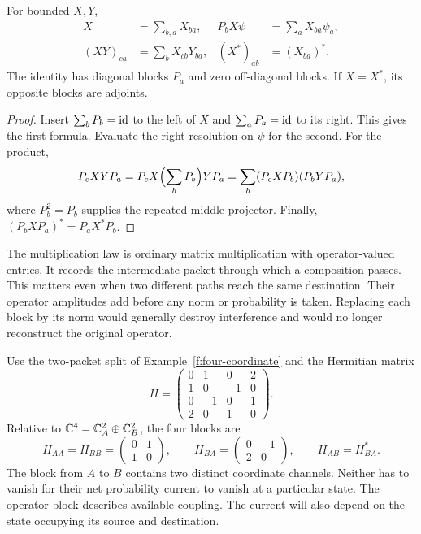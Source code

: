 \begin{proposition}\label{f:block-calculus}
For bounded $X,Y$,
\begin{align}
 X&=\sum_{b,a}X_{ba}, & P_bX\psi&=\sum_aX_{ba}\psi_a,\label{f:block-reconstruction}\\
 (XY)_{ca}&=\sum_bX_{cb}Y_{ba}, & (X^*)_{ab}&=(X_{ba})^*.
 \label{f:block-product}
\end{align}
The identity has diagonal blocks $P_a$ and zero off-diagonal blocks. If $X=X^*$, its opposite blocks are adjoints.
\end{proposition}

\begin{proof}
Insert $\sum_bP_b=\mathrm{id}$ to the left of $X$ and $\sum_aP_a=\mathrm{id}$ to its right. This gives the first formula. Evaluate the right resolution on $\psi$ for the second. For the product,
\[
 P_cXYP_a=P_cX\Bigl(\sum_bP_b\Bigr)YP_a
 =\sum_b(P_cXP_b)(P_bYP_a),
\]
where $P_b^2=P_b$ supplies the repeated middle projector. Finally,
$(P_bXP_a)^*=P_aX^*P_b$.
\end{proof}

The multiplication law is ordinary matrix multiplication with operator-valued entries. It records the intermediate packet through which a composition passes. This matters even when two different paths reach the same destination. Their operator amplitudes add before any norm or probability is taken. Replacing each block by its norm would generally destroy interference and would no longer reconstruct the original operator.

\begin{example}\label{f:corner-example}
Use the two-packet split of Example~\ref{f:four-coordinate} and the Hermitian matrix
\[
 H=\begin{pmatrix}
 0&1&0&2\\1&0&-1&0\\0&-1&0&1\\2&0&1&0
 \end{pmatrix}.
\]
Relative to $\mathbb C^4=\mathbb C^2_A\oplus\mathbb C^2_B$, the four blocks are
\[
 H_{AA}=H_{BB}=\begin{pmatrix}0&1\\1&0\end{pmatrix},\qquad
 H_{BA}=\begin{pmatrix}0&-1\\2&0\end{pmatrix},\qquad
 H_{AB}=H_{BA}^*.
\]
The block from $A$ to $B$ contains two distinct coordinate channels. Neither has to vanish for their net probability current to vanish at a particular state. The operator block describes available coupling. The current will also depend on the state occupying its source and destination.
\end{example}

